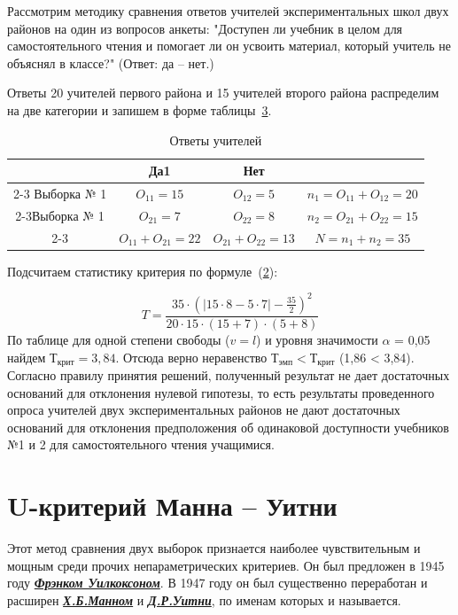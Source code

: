 \documentclass[12pt]{article}
\begin{document}
Рассмотрим методику сравнения ответов учителей экспериментальных школ двух районов на один из вопросов анкеты: "Доступен ли учебник в целом для самостоятельного чтения и помогает ли он усвоить материал, который учитель не объяснял в классе?" (Ответ: да – нет.)

Ответы 20 учителей первого района и 15 учителей второго района распределим на две категории и запишем в форме таблицы~\hyperref[tbl:teachers-anwers]{3}.

\begin{table}[h]
    \label{tbl:teachers-anwers}
    \centering
    \caption{Ответы учителей}
    \bigskip
    \begin{tabular}{c|c|c|c} 
         &Да1&Нет&  \\
         \cline{2-3} Выборка № 1&\textit{$O_{11} = 15$}&\textit{$O_{12} = 5$}&\textit{$n_1 = O_{11} + O_{12} = 20$} \\
         \cline{2-3}Выборка № 1&\textit{$O_{21} = 7$}&\textit{$O_{22} = 8$}&\textit{$n_2 = O_{21} + O_{22} = 15$} \\
         \cline{2-3}&\textit{$O_{11} + O_{21} = 22$}&\textit{$O_{21} + O_{22} = 13$}&\textit{$N = n_1 + n_2 = 35$}  \\
    \end{tabular}
\end{table}

Подсчитаем статистику критерия по формуле~(\hyperref[eq:t]{2}):

$$
    T=\frac{35 \cdot (|15 \cdot 8 - 5 \cdot 7| - \frac{35}{2})^2}{20 \cdot 15 \cdot (15 + 7) \cdot (5 + 8)}
$$
По таблице для одной степени свободы ($v = l$) и уровня значимости $\alpha$ = 0,05 найдем $Т_{крит} = 3,84$. Отсюда верно неравенство $Т_{эмп} < Т_{крит}$ (1,86 < 3,84). Согласно правилу принятия решений, полученный результат не дает достаточных оснований для отклонения нулевой гипотезы, то есть результаты проведенного опроса учителей двух экспериментальных районов не дают достаточных оснований для отклонения предположения об одинаковой доступности учебников №1 и 2 для самостоятельного чтения учащимися.

\medskip
\section{U-критерий Манна – Уитни}

\medskip
Этот метод сравнения двух выборок признается наиболее чувствительным и мощным среди прочих непараметрических критериев. Он был предложен в 1945 году \href{https://ru.wikipedia.org/wiki/%D0%A3%D0%B8%D0%BB%D0%BA%D0%BE%D0%BA%D1%81%D0%BE%D0%BD,_%D0%A4%D1%80%D1%8D%D0%BD%D0%BA}{\textbf{\textit{Фрэнком Уилкоксоном}}}. В 1947 году он был существенно переработан и расширен \href{https://ru.wikipedia.org/wiki/%D0%9C%D0%B0%D0%BD%D0%BD,_%D0%93%D0%B5%D0%BD%D1%80%D0%B8}{\textbf{\textit{Х.Б.Манном}}} и \href{http://sections.maa.org/ohio/ohio_masters/whitney.pdf}{\textbf{\textit{Д.Р.Уитни}}}, по именам которых и называется.
\end{document}
